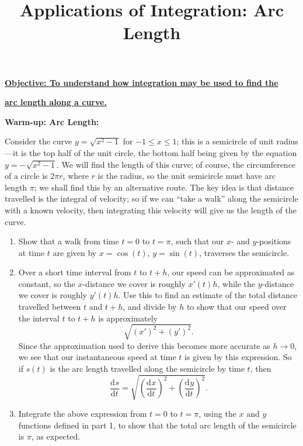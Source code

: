 \documentclass{article}
\newcommand{\deriv}[3][]{\frac{\mathrm{d}^{#1}#2}{\mathrm{d}#3^{#1}}}
\begin{document}
\title{Applications of Integration: Arc Length}
\date{}

\maketitle
\thispagestyle{empty}

\Large

\textbf{\underline{Objective: To understand how integration may be used to find the}}

\textbf{\underline{arc length along a curve.}}






\vspace{10mm}



\textbf{Warm-up: Arc Length:}\bigskip

Consider the curve $y=\sqrt{x^2-1}$ for $-1\leq x\leq 1$; this is a semicircle of unit radius---it is the top half of the unit circle, the bottom half being given by the equation $y=-\sqrt{x^2-1}$. We will find the length of this curve; of course, the circumference of a circle is $2\pi r$, where $r$ is the radius, so the unit semicircle must have arc length $\pi$; we shall find this by an alternative route. The key idea is that distance travelled is the integral of velocity; so if we can ``take a walk'' along the semicircle with a known velocity, then integrating this velocity will give us the length of the curve.

\begin{enumerate}
	\item Show that a walk from time $t=0$ to $t=\pi$, such that our $x$- and $y$-positions at time $t$ are given by $x=\cos(t)$, $y=\sin(t)$, traverses the semicircle.
	\item Over a short time interval from $t$ to $t+h$, our speed can be approximated as constant, so the $x$-distance we cover is roughly $x'(t)h$, while the $y$-distance we cover is roughly $y'(t)h$. Use this to find an estimate of the total distance travelled between $t$ and $t+h$, and divide by $h$ to show that our speed over the interval $t$ to $t+h$ is approximately
		\[\sqrt{(x')^2+(y')^2}.\]
		Since the approximation used to derive this becomes more accurate as $h\to 0$, we see that our instantaneous speed at time $t$ is given by this expression. So if $s(t)$ is the arc length travelled along the semicircle by time $t$, then
		\[\deriv{s}{t}=\sqrt{\left(\deriv{x}{t}\right)^2+\left(\deriv{y}{t}\right)^2}.\]
	\item Integrate the above expression from $t=0$ to $t=\pi$, using the $x$ and $y$ functions defined in part 1, to show that the total arc length of the semicircle is $\pi$, as expected.
\end{enumerate}
\end{document}
